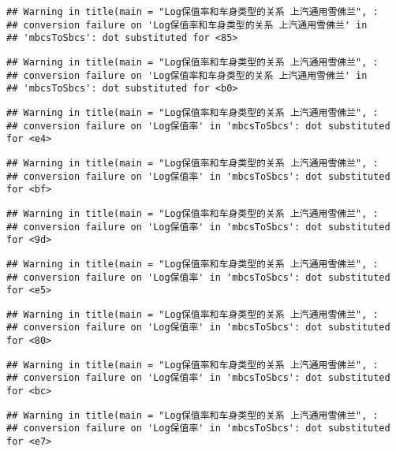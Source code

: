 \documentclass[]{article}
\begin{document}
\begin{verbatim}
## Warning in title(main = "Log保值率和车身类型的关系 上汽通用雪佛兰", :
## conversion failure on 'Log保值率和车身类型的关系 上汽通用雪佛兰' in
## 'mbcsToSbcs': dot substituted for <85>
\end{verbatim}

\begin{verbatim}
## Warning in title(main = "Log保值率和车身类型的关系 上汽通用雪佛兰", :
## conversion failure on 'Log保值率和车身类型的关系 上汽通用雪佛兰' in
## 'mbcsToSbcs': dot substituted for <b0>
\end{verbatim}

\begin{verbatim}
## Warning in title(main = "Log保值率和车身类型的关系 上汽通用雪佛兰", :
## conversion failure on 'Log保值率' in 'mbcsToSbcs': dot substituted for <e4>
\end{verbatim}

\begin{verbatim}
## Warning in title(main = "Log保值率和车身类型的关系 上汽通用雪佛兰", :
## conversion failure on 'Log保值率' in 'mbcsToSbcs': dot substituted for <bf>
\end{verbatim}

\begin{verbatim}
## Warning in title(main = "Log保值率和车身类型的关系 上汽通用雪佛兰", :
## conversion failure on 'Log保值率' in 'mbcsToSbcs': dot substituted for <9d>
\end{verbatim}

\begin{verbatim}
## Warning in title(main = "Log保值率和车身类型的关系 上汽通用雪佛兰", :
## conversion failure on 'Log保值率' in 'mbcsToSbcs': dot substituted for <e5>
\end{verbatim}

\begin{verbatim}
## Warning in title(main = "Log保值率和车身类型的关系 上汽通用雪佛兰", :
## conversion failure on 'Log保值率' in 'mbcsToSbcs': dot substituted for <80>
\end{verbatim}

\begin{verbatim}
## Warning in title(main = "Log保值率和车身类型的关系 上汽通用雪佛兰", :
## conversion failure on 'Log保值率' in 'mbcsToSbcs': dot substituted for <bc>
\end{verbatim}

\begin{verbatim}
## Warning in title(main = "Log保值率和车身类型的关系 上汽通用雪佛兰", :
## conversion failure on 'Log保值率' in 'mbcsToSbcs': dot substituted for <e7>
\end{verbatim}
\end{document}
